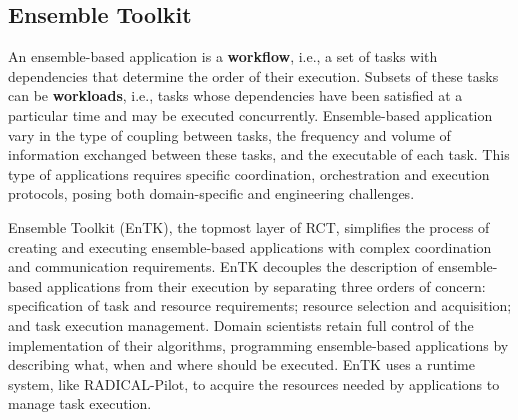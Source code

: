 \subsection{Ensemble Toolkit}\label{ssec:entk}

An ensemble-based application is a \textbf{workflow}, i.e., a set of tasks
with dependencies that determine the order of their execution. Subsets of
these tasks can be \textbf{workloads}, i.e., tasks whose dependencies have
been satisfied at a particular time and may be executed concurrently.
Ensemble-based application vary in the type of coupling between tasks, the
frequency and volume of information exchanged between these tasks, and the
executable of each task. This type of applications requires specific
coordination, orchestration and execution protocols, posing both
domain-specific and engineering challenges.

Ensemble Toolkit (EnTK), the topmost layer of RCT, simplifies the process of
creating and executing ensemble-based applications with complex coordination
and communication requirements. EnTK decouples the description of
ensemble-based applications from their execution by separating three orders
of concern: specification of task and resource requirements; resource
selection and acquisition; and task execution management. 
Domain scientists retain full control of the implementation of their
algorithms, programming ensemble-based applications by describing what, when
and where should be executed. EnTK uses a runtime system, like RADICAL-Pilot,
to acquire the resources needed by applications to manage task execution.



